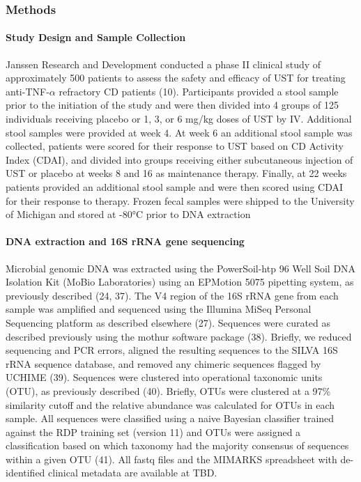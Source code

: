 \documentclass[11pt,]{article}
\let\oldparagraph\paragraph
\renewcommand{\paragraph}[1]{\oldparagraph{#1}\mbox{}}
\begin{document}
\newpage

\subsubsection{Methods}\label{methods}

\paragraph{Study Design and Sample
Collection}\label{study-design-and-sample-collection}

Janssen Research and Development conducted a phase II clinical study of
approximately 500 patients to assess the safety and efficacy of UST for
treating anti-TNF-\({\alpha}\) refractory CD patients (10). Participants
provided a stool sample prior to the initiation of the study and were
then divided into 4 groups of 125 individuals receiving placebo or 1, 3,
or 6 mg/kg doses of UST by IV. Additional stool samples were provided at
week 4. At week 6 an additional stool sample was collected, patients
were scored for their response to UST based on CD Activity Index (CDAI),
and divided into groups receiving either subcutaneous injection of UST
or placebo at weeks 8 and 16 as maintenance therapy. Finally, at 22
weeks patients provided an additional stool sample and were then scored
using CDAI for their response to therapy. Frozen fecal samples were
shipped to the University of Michigan and stored at -80°C prior to DNA
extraction

\paragraph{DNA extraction and 16S rRNA gene
sequencing}\label{dna-extraction-and-16s-rrna-gene-sequencing}

Microbial genomic DNA was extracted using the PowerSoil-htp 96 Well Soil
DNA Isolation Kit (MoBio Laboratories) using an EPMotion 5075 pipetting
system, as previously described (24, 37). The V4 region of the 16S rRNA
gene from each sample was amplified and sequenced using the Illumina
MiSeq Personal Sequencing platform as described elsewhere (27).
Sequences were curated as described previously using the mothur software
package (38). Briefly, we reduced sequencing and PCR errors, aligned the
resulting sequences to the SILVA 16S rRNA sequence database, and removed
any chimeric sequences flagged by UCHIME (39). Sequences were clustered
into operational taxonomic units (OTU), as previously described (40).
Briefly, OTUs were clustered at a 97\% similarity cutoff and the
relative abundance was calculated for OTUs in each sample. All sequences
were classified using a naive Bayesian classifier trained against the
RDP training set (version 11) and OTUs were assigned a classification
based on which taxonomy had the majority consensus of sequences within a
given OTU (41). All fastq files and the MIMARKS spreadsheet with
de-identified clinical metadata are available at TBD.
\end{document}
